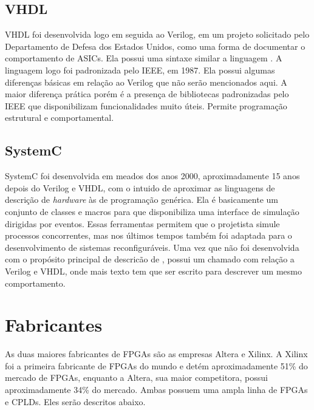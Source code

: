 \documentclass[11pt,a4paper,oneside]{book}
\begin{document}
\subsection{VHDL}
VHDL foi desenvolvida logo em seguida ao Verilog, em um projeto solicitado pelo Departamento de Defesa dos Estados Unidos, como uma forma de documentar o comportamento de ASICs.
Ela possui uma sintaxe similar a linguagem .
A linguagem logo foi padronizada pelo IEEE, em 1987.
Ela possui algumas diferen\c{c}as b\'asicas em rela\c{c}\~ao ao Verilog que n\~ao ser\~ao mencionados aqui.
A maior diferen\c{c}a pr\'atica por\'em \'e a presen\c{c}a de bibliotecas padronizadas pelo IEEE que disponibilizam funcionalidades muito \'uteis.
Permite programação estrutural e comportamental.

\subsection{SystemC}
SystemC foi desenvolvida em meados dos anos 2000, aproximadamente 15 anos depois do Verilog e VHDL, com o intuido de aproximar as linguagens de descri\c{c}\~ao de \textit{hardware} \`as de programa\c{c}\~ao gen\'erica.
Ela \'e basicamente um conjunto de classes e macros para  que disponibiliza uma interface de simula\c{c}\~ao dirigidas por eventos.
Essas ferramentas permitem que o projetista simule processos concorrentes, mas nos \'ultimos tempos tamb\'em foi adaptada para o desenvolvimento de sistemas reconfigur\'aveis.
Uma vez que n\~ao foi desenvolvida com o prop\'osito principal de descric\~ao de , possui um chamado  com rela\c{c}\~ao a Verilog e VHDL, onde mais texto tem que ser escrito para descrever um mesmo comportamento.

\section{Fabricantes}
As duas maiores fabricantes de FPGAs s\~ao as empresas Altera e Xilinx.
A Xilinx foi a primeira fabricante de FPGAs do mundo e det\'em aproximadamente 51\% do mercado de FPGAs, enquanto a Altera, sua maior competitora, possui aproximadamente 34\% do mercado.
Ambas possuem uma ampla linha de FPGAs e CPLDs.
Eles ser\~ao descritos abaixo.
\end{document}
